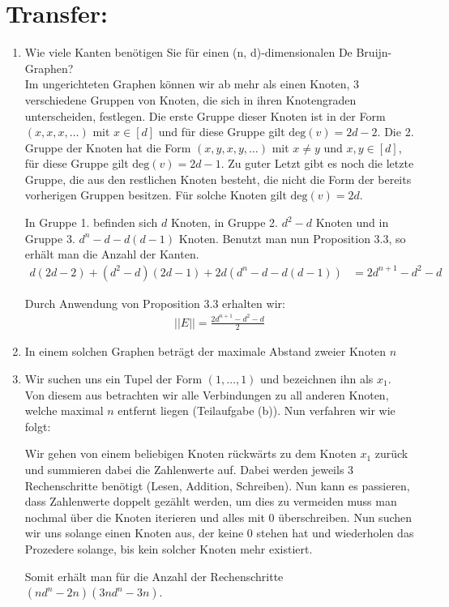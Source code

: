     \section*{Transfer:}
    \begin{enumerate}[label=(\alph*)]
    	\item Wie viele Kanten benötigen Sie für einen (n, d)-dimensionalen De Bruijn-Graphen?\\
        Im ungerichteten Graphen können wir ab mehr als einen Knoten, 3 verschiedene Gruppen von Knoten, die sich in ihren Knotengraden unterscheiden, festlegen. Die erste Gruppe dieser Knoten ist in der Form $(x,x,x,\ldots)$ mit $x \in [d]$ und für diese Gruppe gilt $\textrm{deg}(v) = 2d -2$. Die 2. Gruppe der Knoten hat die Form $(x,y,x,y,\ldots)$ mit $x \not = y$ und $x,y \in [d]$, für diese Gruppe gilt $\textrm{deg}(v) = 2d -1$. Zu guter Letzt gibt es noch die letzte Gruppe, die aus den restlichen Knoten besteht, die nicht die Form der bereits vorherigen Gruppen besitzen. Für solche Knoten gilt $\textrm{deg}(v) = 2d$.\par
        In Gruppe 1. befinden sich $d$ Knoten, in Gruppe 2. $d^2-d$ Knoten und in Gruppe 3. $d^n - d - d(d-1)$ Knoten. Benutzt man nun Proposition 3.3, so erhält man die Anzahl der Kanten. 
        \begin{align*}
        d(2d-2) + (d^2-d)(2d-1) + 2d(d^n-d-d(d-1)) &= 2d^{n+1}-d^2-d
        \end{align*}
        
        Durch Anwendung von Proposition 3.3 erhalten wir:
        \begin{align*}
        ||E|| = \frac{2d^{n+1}-d^2-d}{2}
        \end{align*}
        
        \item In einem solchen Graphen beträgt der maximale Abstand zweier Knoten $n$
        
        \item Wir suchen uns ein Tupel der Form $(1,\ldots,1)$ und bezeichnen ihn als $x_1$. Von diesem aus betrachten wir alle Verbindungen zu all anderen Knoten, welche maximal $n$ entfernt liegen (Teilaufgabe (b)). Nun verfahren wir wie folgt: \par
        Wir gehen von einem beliebigen Knoten rückwärts zu dem Knoten $x_1$ zurück  und summieren dabei die Zahlenwerte auf. Dabei werden jeweils 3 Rechenschritte benötigt (Lesen, Addition, Schreiben). Nun kann es passieren, dass Zahlenwerte doppelt gezählt werden, um dies zu vermeiden muss man nochmal über die Knoten iterieren und alles mit 0 überschreiben. Nun suchen wir uns solange einen Knoten aus, der keine 0 stehen hat und wiederholen das Prozedere solange, bis kein solcher Knoten mehr existiert. \par
        Somit erhält man für die Anzahl der Rechenschritte $(nd^n-2n)(3nd^n-3n)$.
    \end{enumerate}
